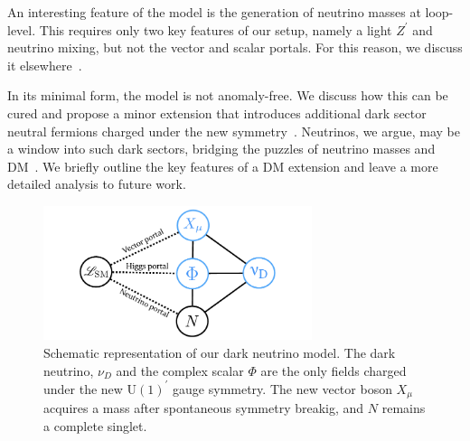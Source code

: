 An interesting feature of the model is the generation of neutrino masses at loop-level. This requires only two key features of our setup, namely a light $Z^\prime$ and neutrino mixing, but not the vector and scalar portals. For this reason, we discuss it elsewhere~\cite{Ballett:2019cqp}.

In its minimal form, the model is not anomaly-free. We discuss how this can be cured and propose a minor extension that introduces additional dark sector neutral fermions charged under the new symmetry~\cite{Boehm:2003hm,*Boehm:2003ha}. Neutrinos, we argue, may be a window into such dark sectors, bridging the puzzles of neutrino masses and DM~\cite{Ma:2006km,Farzan:2009ji,Farzan:2010mr,Arhrib:2015dez,Cherry:2014xra,Escudero:2016tzx,Escudero:2016ksa,Batell:2017cmf,Capozzi:2017auw,Campo:2017nwh,Blennow:2019fhy}. We briefly outline the key features of a DM extension and leave a more detailed analysis to future work.

%
\begin{figure}[t]
\centering\includegraphics[width=0.7\textwidth]{dark_nus/portals.pdf}
\caption[Dark neutrino model diagram.]{Schematic representation of our dark neutrino model. The dark neutrino, $\nu_{D}$ and the complex scalar $\Phi$ are the only fields charged under the new U$(1)^\prime$ gauge symmetry. The new vector boson $X_\mu$ acquires a mass after spontaneous symmetry breakig, and $N$ remains a complete singlet.
\label{fig:Tdiagrams}}
\end{figure}
%



